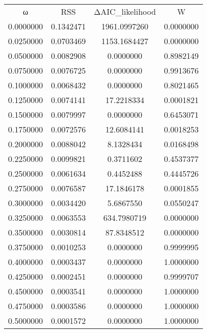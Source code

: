 \begin{tabular}{cccc}
ω & RSS & ΔAIC_likelihood & W\\
0.0000000 & 0.1342471 & 1961.0997260 & 0.0000000\\
0.0250000 & 0.0703469 & 1153.1684427 & 0.0000000\\
0.0500000 & 0.0082908 & 0.0000000 & 0.8982149\\
0.0750000 & 0.0076725 & 0.0000000 & 0.9913676\\
0.1000000 & 0.0068432 & 0.0000000 & 0.8021465\\
0.1250000 & 0.0074141 & 17.2218334 & 0.0001821\\
0.1500000 & 0.0079997 & 0.0000000 & 0.6453071\\
0.1750000 & 0.0072576 & 12.6084141 & 0.0018253\\
0.2000000 & 0.0088042 & 8.1328434 & 0.0168498\\
0.2250000 & 0.0099821 & 0.3711602 & 0.4537377\\
0.2500000 & 0.0061634 & 0.4452488 & 0.4445726\\
0.2750000 & 0.0076587 & 17.1846178 & 0.0001855\\
0.3000000 & 0.0034420 & 5.6867550 & 0.0550247\\
0.3250000 & 0.0063553 & 634.7980719 & 0.0000000\\
0.3500000 & 0.0030814 & 87.8348512 & 0.0000000\\
0.3750000 & 0.0010253 & 0.0000000 & 0.9999995\\
0.4000000 & 0.0003437 & 0.0000000 & 1.0000000\\
0.4250000 & 0.0002451 & 0.0000000 & 0.9999707\\
0.4500000 & 0.0003541 & 0.0000000 & 1.0000000\\
0.4750000 & 0.0003586 & 0.0000000 & 1.0000000\\
0.5000000 & 0.0001572 & 0.0000000 & 1.0000000\\
\end{tabular}
